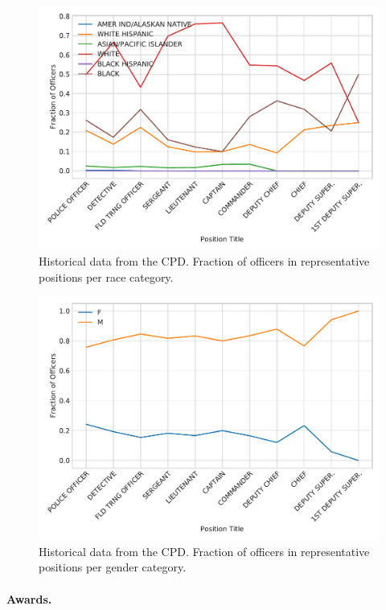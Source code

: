 \begin{figure}[h] 
\includegraphics[width=\textwidth]{figs/position_race} 
\caption{Historical data from the CPD. Fraction of officers in representative positions 
per race category.} \label{fig:salary}
\end{figure}

\begin{figure}[h] 
\includegraphics[width=\textwidth]{figs/position_gender} 
\caption{Historical data from the CPD. Fraction of officers in representative positions 
per gender category.} \label{fig:salary}
\end{figure}

\paragraph{Awards.}

